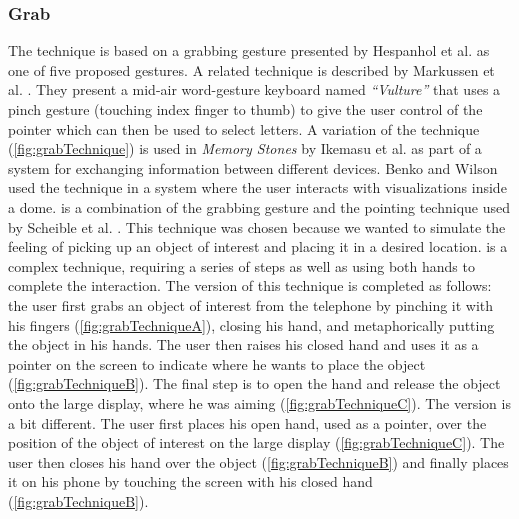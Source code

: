 \subsubsection{Grab} \label{sec:grabTechnique}
The \grab technique is based on a grabbing gesture presented by Hespanhol et al. \cite{Hespanhol:2012} as one of five proposed gestures.
A related technique is described by Markussen et al. \cite{Markussen:2014}. 
They present a mid-air word-gesture keyboard named \emph{``Vulture''} that uses a pinch gesture (touching index finger to thumb) to give the user control of the pointer which can then be used to select letters.
A variation of the \grab technique (\cref{fig:grabTechnique}) is used in \emph{Memory Stones} \cite{Ikematsu:2015} by Ikemasu et al. as part of a system for exchanging information between different devices. Benko and Wilson \cite{Benko:2010} used the \grab technique in a system where the user interacts with visualizations inside a dome. \grab is a combination of the grabbing gesture and the pointing technique used by Scheible et al. \cite{Scheible:2008}.
This technique was chosen because we wanted to simulate the feeling of picking up an object of interest and placing it in a desired location.
\grab is a complex technique, requiring a series of steps as well as using both hands to complete the interaction.
The \push version of this technique is completed as follows: the user first grabs an object of interest from the telephone by pinching it with his fingers (\cref{fig:grabTechniqueA}), closing his hand, and metaphorically putting the object in his hands.
The user then raises his closed hand and uses it as a pointer on the screen to indicate where he wants to place the object (\cref{fig:grabTechniqueB}).
The final step is to open the hand and release the object onto the large display, where he was aiming (\cref{fig:grabTechniqueC}).
The \pull version is a bit different.
The user first places his open hand, used as a pointer, over the position of the object of interest on the large display (\cref{fig:grabTechniqueC}).
The user then closes his hand over the object (\cref{fig:grabTechniqueB}) and finally places it on his phone by touching the screen with his closed hand (\cref{fig:grabTechniqueB}).  

